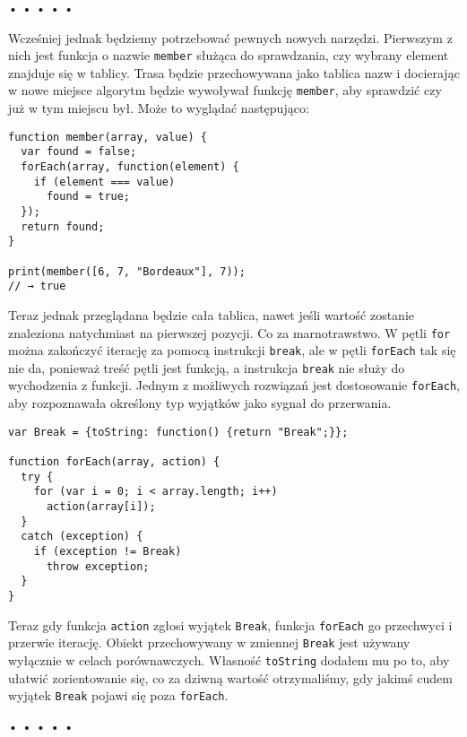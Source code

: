 \begin{center}
• • • • •
\end{center}

  
Wcześniej jednak będziemy potrzebować pewnych nowych narzędzi. Pierwszym z nich jest funkcja o nazwie \texttt{member} służąca do sprawdzania, czy wybrany element znajduje się w tablicy. Trasa będzie przechowywana jako tablica nazw i docierając w nowe miejsce algorytm będzie wywoływał funkcję \texttt{member}, aby sprawdzić czy już w tym miejscu był. Może to wyglądać następująco:

  
\begin{verbatim} 
function member(array, value) {
  var found = false;
  forEach(array, function(element) {
    if (element === value)
      found = true;
  });
  return found;
}

print(member([6, 7, "Bordeaux"], 7));
// → true
\end{verbatim}
  
Teraz jednak przeglądana będzie cała tablica, nawet jeśli wartość zostanie znaleziona natychmiast na pierwszej pozycji. Co za marnotrawstwo. W pętli \texttt{for} można zakończyć iterację za pomocą instrukcji \texttt{break}, ale w pętli \texttt{forEach} tak się nie da, ponieważ treść pętli jest funkcją, a instrukcja \texttt{break} nie służy do wychodzenia z funkcji. Jednym z możliwych rozwiązań jest dostosowanie \texttt{forEach}, aby rozpoznawała określony typ wyjątków jako sygnał do przerwania.

  
\begin{verbatim} 
var Break = {toString: function() {return "Break";}};

function forEach(array, action) {
  try {
    for (var i = 0; i < array.length; i++)
      action(array[i]);
  }
  catch (exception) {
    if (exception != Break)
      throw exception;
  }
}
 \end{verbatim}
  
Teraz gdy funkcja \texttt{action} zgłosi wyjątek \texttt{Break}, funkcja \texttt{forEach} go przechwyci i przerwie iterację. Obiekt przechowywany w zmiennej \texttt{Break} jest używany wyłącznie w celach porównawczych. Własność \texttt{toString} dodałem mu po to, aby ułatwić zorientowanie się, co za dziwną wartość otrzymaliśmy, gdy jakimś cudem wyjątek \texttt{Break} pojawi się poza \texttt{forEach}.



\begin{center}
• • • • •
\end{center}


